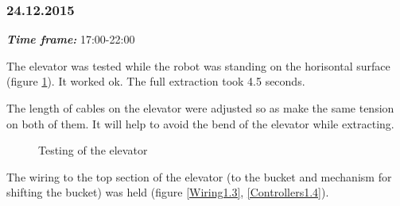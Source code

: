 \subsubsection{24.12.2015}
\textit{\textbf{Time frame:}} 17:00-22:00 

The elevator was tested while the robot was standing on the horisontal surface (figure \ref{Elevator2.5}). It worked ok. The full extraction took 4.5 seconds.

The length of cables on the elevator were adjusted so as make the same tension on both of them. It will help to avoid the bend of the elevator while extracting.

\begin{figure}[H]
	\begin{minipage}[h]{1\linewidth}
		\caption{Testing of the elevator}
		\label{Elevator2.5}
	\end{minipage}
\end{figure}

The wiring to the top section of the elevator (to the bucket and mechanism for shifting the bucket) was held (figure \ref{Wiring1.3}, \ref{Controllers1.4}).

